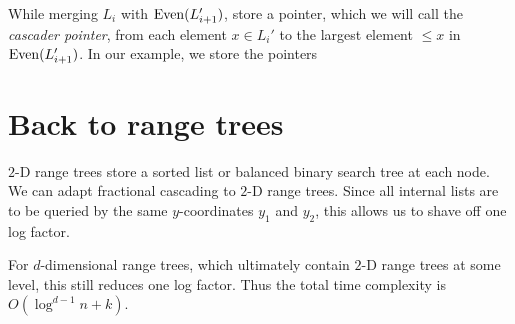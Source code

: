 \begin{solution}
    While merging $L_i$ with $\operatorname{Even}(L_{i+1}')$, store a pointer,
    which we will call the \emph{cascader pointer},
    from each element $x \in L_i'$ to the largest element $\le x$ in
    $\operatorname{Even}(L_{i+1}')$.
    In our example, we store the pointers
    \begin{center}
    \end{center}
\end{solution}

\section{Back to range trees} \label{sec:back-to-2-d-range-trees}
$2$-D range trees store a sorted list or balanced binary search tree
at each node.
We can adapt fractional cascading to $2$-D range trees.
Since all internal lists are to be queried by the same $y$-coordinates
$y_1$ and $y_2$, this allows us to shave off one log factor.

For $d$-dimensional range trees, which ultimately contain $2$-D range trees
at some level, this still reduces one log factor.
Thus the total time complexity is $O(\log^{d-1} n + k)$.
